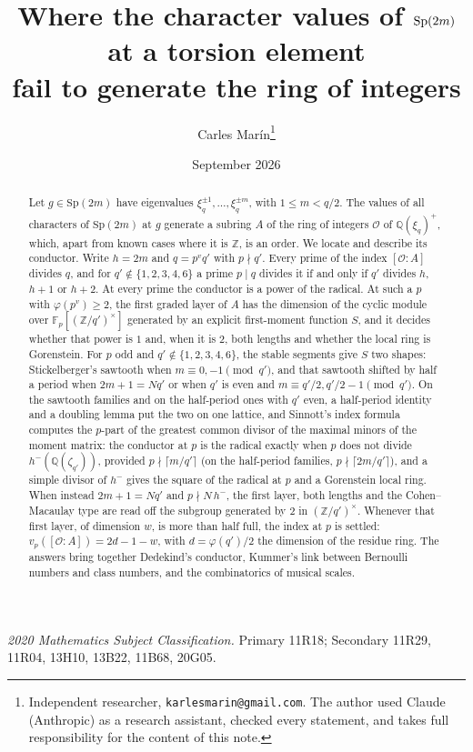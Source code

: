 \documentclass[11pt,a4paper]{article}
\title{\vspace{-1.4cm}\Large Where the character values of $\Sp(2m)$ at a torsion element\\
fail to generate the ring of integers}
\author{\normalsize Carles Mar\'in\thanks{Independent researcher, \texttt{karlesmarin@gmail.com}.
The author used Claude (Anthropic) as a research assistant, checked every statement, and takes full
responsibility for the content of this note.}}
\date{\normalsize September 2026}
\theoremstyle{definition}
\newcommand{\Sp}{\mathrm{Sp}}
\newcommand{\ZZ}{\mathbb{Z}}
\newcommand{\QQ}{\mathbb{Q}}
\newcommand{\FF}{\mathbb{F}}
\newcommand{\cO}{\mathcal{O}}
\begin{document}
\maketitle
\thispagestyle{empty}\enlargethispage{2pt}

\begin{abstract}
\noindent Let $g\in\Sp(2m)$ have eigenvalues $\xi_q^{\pm1},\dots,\xi_q^{\pm m}$, with $1\le m<q/2$. The values of
all characters of $\Sp(2m)$ at $g$ generate a subring $A$ of the ring of integers $\cO$ of $\QQ(\xi_q)^+$, which,
apart from known cases where it is $\ZZ$, is an order. We locate and describe its conductor. Write $h=2m$ and
$q=p^vq'$ with $p\nmid q'$. Every prime of the index $[\cO:A]$ divides $q$, and for $q'\notin\{1,2,3,4,6\}$ a prime
$p\mid q$ divides it if and only if $q'$ divides $h$, $h+1$ or $h+2$. At every prime the conductor is a power of
the radical. At such a $p$ with $\varphi(p^v)\ge2$, the first graded layer of $A$ has the dimension of the cyclic
module over $\FF_p[(\ZZ/q')^\times]$ generated by an explicit first-moment function $S$, and it decides whether that
power is $1$ and, when it is $2$, both lengths and whether the local ring is Gorenstein. For $p$ odd and
$q'\notin\{1,2,3,4,6\}$, the stable segments give $S$ two shapes: Stickelberger's sawtooth when
$m\equiv0,-1\pmod{q'}$, and that sawtooth shifted by half a period when $2m+1=Nq'$ or when $q'$ is even and
$m\equiv q'/2,q'/2-1\pmod{q'}$. On the sawtooth families and on the half-period ones with $q'$ even, a half-period
identity and a doubling lemma put the two on one lattice, and Sinnott's index formula computes the $p$-part of the
greatest common divisor of the maximal minors of the moment matrix: the conductor at $p$ is the radical exactly when $p$ does not divide
$h^-(\QQ(\zeta_{q'}))$, provided $p\nmid\lceil m/q'\rceil$ (on the half-period families, $p\nmid\lceil 2m/q'\rceil$), and a simple divisor of $h^-$ gives the square of the radical at $p$ and a Gorenstein local ring. When
instead $2m+1=Nq'$ and $p\nmid N\,h^-$, the first layer, both lengths and the Cohen--Macaulay type are read off the
subgroup generated by $2$ in $(\ZZ/q')^\times$. Whenever that first layer, of dimension $w$, is more than half full,
the index at $p$ is settled: $v_p([\cO:A])=2d-1-w$, with $d=\varphi(q')/2$ the dimension of the residue ring. The answers bring together
Dedekind's conductor, Kummer's link between Bernoulli numbers and class numbers, and the combinatorics of musical
scales.
\end{abstract}

\medskip
\begin{center}\small
\emph{2020 Mathematics Subject Classification.}\;
Primary 11R18; Secondary 11R29, 11R04, 13H10, 13B22, 11B68, 20G05.
\end{center}
\end{document}
